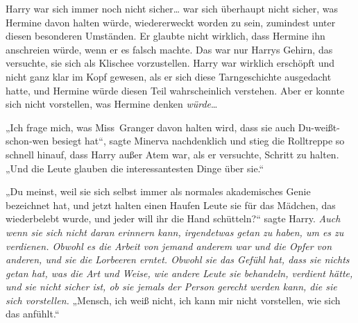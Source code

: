 Harry war sich immer noch nicht sicher… war sich überhaupt nicht sicher, was Hermine davon halten würde, wiedererweckt worden zu sein, zumindest unter diesen besonderen Umständen. Er glaubte nicht wirklich, dass Hermine ihn anschreien würde, wenn er es falsch machte. Das war nur Harrys Gehirn, das versuchte, sie sich als Klischee vorzustellen. Harry war wirklich erschöpft und nicht ganz klar im Kopf gewesen, als er sich diese Tarngeschichte ausgedacht hatte, und Hermine würde diesen Teil wahrscheinlich verstehen. Aber er konnte sich nicht vorstellen, was Hermine denken \emph{würde}…

„Ich frage mich, was Miss~Granger davon halten wird, dass sie auch Du-weißt-schon-wen besiegt hat“, sagte Minerva nachdenklich und stieg die Rolltreppe so schnell hinauf, dass Harry außer Atem war, als er versuchte, Schritt zu halten.
„Und die Leute glauben die interessantesten Dinge über sie.“

„Du meinst, weil sie sich selbst immer als normales akademisches Genie bezeichnet hat, und jetzt halten einen Haufen Leute sie für das Mädchen, das wiederbelebt wurde, und jeder will ihr die Hand schütteln?“ sagte Harry.
\emph{Auch wenn sie sich nicht daran erinnern kann, irgendetwas getan zu haben, um es zu verdienen. Obwohl es die Arbeit von jemand anderem war und die Opfer von anderen, und sie die Lorbeeren erntet. Obwohl sie das Gefühl hat, dass sie nichts getan hat, was die Art und Weise, wie andere Leute sie behandeln, verdient hätte, und sie nicht sicher ist, ob sie jemals der Person gerecht werden kann, die sie sich vorstellen.}
„Mensch, ich weiß nicht, ich kann mir nicht vorstellen, wie sich das anfühlt.“

